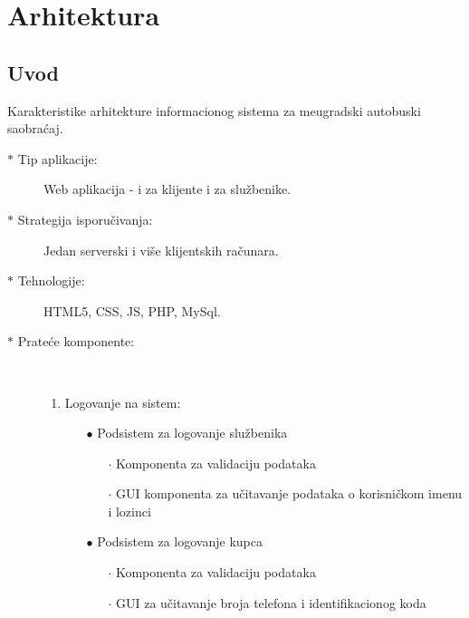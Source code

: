 \section{Arhitektura}
\subsection{Uvod}
Karakteristike arhitekture informacionog sistema za me\dj{}ugradski autobuski saobra\' caj.

\begin{description}
	\item[$\ast$ Tip aplikacije:] Web aplikacija - i za klijente i za slu\v zbenike.
	\item[$\ast$ Strategija isporu\v civanja:] Jedan serverski i vi\v se klijentskih ra\v cunara.
	\item[$\ast$ Tehnologije:] HTML5, CSS, JS, PHP, MySql.
	\item[$\ast$ Prate\' ce komponente:] \ 
		\begin{enumerate}
			\item Logovanje na sistem:
				\begin{enumerate}
					\item[$\bullet$] Podsistem za logovanje slu\v zbenika
						\begin{enumerate}
							\item[$\cdot$] Komponenta za validaciju podataka
							\item[$\cdot$] GUI komponenta za u\v citavanje podataka o korisni\v ckom imenu i lozinci
						\end{enumerate}
					\item[$\bullet$] Podsistem za logovanje kupca
					\begin{enumerate}
						\item[$\cdot$] Komponenta za validaciju podataka
						\item[$\cdot$] GUI za u\v citavanje broja telefona i identifikacionog koda
					\end{enumerate}
					

\end{enumerate}
\end{enumerate}
\end{description}
